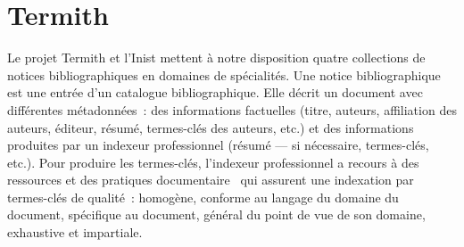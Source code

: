   \section{Termith}
  \label{sec:main-data_description-termith_data}
    Le projet Termith et l'Inist mettent à notre disposition quatre collections
    de notices bibliographiques en domaines de spécialités. Une notice
    bibliographique est une entrée d'un catalogue bibliographique. Elle décrit
    un document avec différentes métadonnées~: des informations factuelles
    (titre, auteurs, affiliation des auteurs, éditeur, résumé, termes-clés des
    auteurs, etc.) et des informations produites par un indexeur professionnel
    (résumé --- si nécessaire, termes-clés, etc.). Pour produire les
    termes-clés, l'indexeur professionnel a recours à des ressources et des
    pratiques documentaire~\cite{guinchat1996techniquesdocumentaires} qui
    assurent une indexation par termes-clés de qualité~: homogène, conforme au
    langage du domaine du document, spécifique au document, général du point de
    vue de son domaine, exhaustive et impartiale.
    

